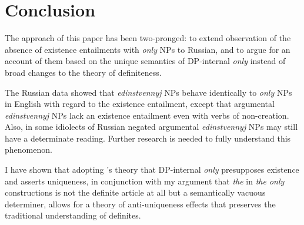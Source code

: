\section{Conclusion \label{sec:conclusion}}
The approach of this paper has been two-pronged: to extend  observation of the absence of existence entailments with \textit{only} NPs to Russian, and to argue for an account of them based on the unique semantics of DP-internal \textit{only} instead of broad changes to the theory of definiteness.

The Russian data showed that \textit{edinstvennyj} NPs behave identically to \textit{only} NPs in English with regard to the existence entailment, except that argumental \textit{edinstvennyj} NPs lack an existence entailment even with verbs of non-creation. Also, in some idiolects of Russian negated argumental \textit{edinstvennyj} NPs may still have a determinate reading. Further research is needed to fully understand this phenomenon.

I have shown that adopting \citeauthor{cb2015}'s theory that DP-internal \textit{only} presupposes existence and asserts uniqueness, in conjunction with my argument that \textit{the} in \textit{the only} constructions is not the definite article at all but a semantically vacuous determiner, allows for a theory of anti-uniqueness effects that preserves the traditional understanding of definites.